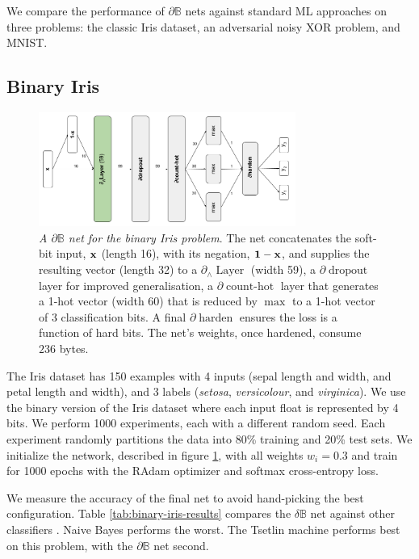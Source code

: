 \documentclass{article}
\theoremstyle{plain}
\theoremstyle{definition}
\theoremstyle{remark}
\begin{document}
We compare the performance of $\partial\mathbb{B}$ nets against standard ML approaches on three problems: the classic Iris dataset, an adversarial noisy XOR problem, and MNIST. 

\subsection{Binary Iris}

\begin{figure}
	\centering
	\includegraphics[width=0.75\textwidth]{../binary-iris-architecture.png}
	\caption{{\em A $\partial\mathbb{B}$ net for the binary Iris problem}. The net concatenates the soft-bit input, ${\bf x}$ (length 16), with its negation, ${\bf 1 - x}$, and supplies the resulting vector (length 32) to a $\partial_{\wedge}\!\operatorname{Layer}$ (width 59), a $\partial\!\operatorname{dropout}$ layer for improved generalisation, a $\partial\!\operatorname{count-hot}$ layer that generates a 1-hot vector (width 60) that is reduced by $\operatorname{max}$ to a 1-hot vector of 3 classification bits. A final $\partial\!\operatorname{harden}$ ensures the loss is a function of hard bits. The net's weights, once hardened, consume $236$ bytes.}
	\label{fig:binary-iris-architecture}
\end{figure}


The Iris dataset has 150 examples with 4 inputs (sepal length and width, and petal length and width), and 3 labels ({\em setosa}, {\em versicolour}, and {\em virginica}). We use the binary version of the Iris dataset \cite{binary-iris-dataset} where each input float is represented by 4 bits. We perform 1000 experiments, each with a different random seed. Each experiment randomly partitions the data into 80\% training and 20\% test sets. We initialize the network, described in figure \ref{fig:binary-iris-architecture}, with all weights $w_{i} = 0.3$ and train for 1000 epochs with the RAdam optimizer and softmax cross-entropy loss. 

We measure the accuracy of the final net to avoid hand-picking the best configuration. Table \ref{tab:binary-iris-results} compares the $\delta\mathbb{B}$ net against other classifiers  \cite{granmo18}. Naive Bayes performs the worst. The Tsetlin machine performs best on this problem, with the $\partial\mathbb{B}$ net second.
\end{document}
